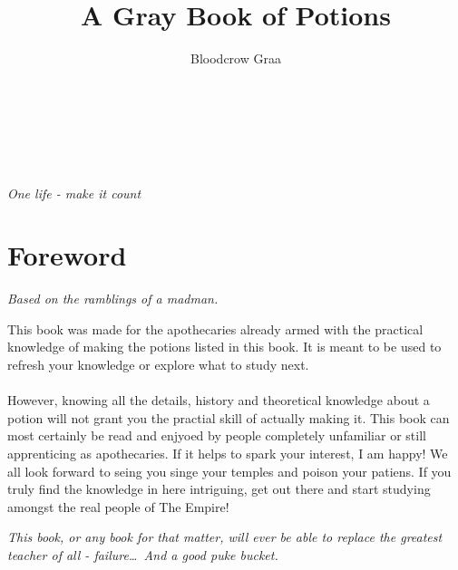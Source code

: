 \documentclass[a5paper,pagesize,10pt,bibtotoc,pointlessnumbers,
normalheadings,DIV=9,twoside=false]{scrbook}
\title{A Gray Book of Potions}
\author{Bloodcrow Graa}
\begin{document}
\begin{titlepage}
		\\
        \vspace{1mm}
        \\
		\vspace{10mm}
		\\
		\vspace{\fill}
\end{titlepage}

\newpage
\thispagestyle {empty}

\vspace*{2cm}

\begin{center}
	\Large{
		\textit{One life - make it count}
	}
\end{center}
\newpage

\tableofcontents



\vspace*{\fill}
\chapter{Foreword}
\begin{center}
    \textit{Based on the ramblings of a madman.}
\end{center}
This book was made for the apothecaries already armed with the practical knowledge of making the potions listed in this book. It is meant to be used to refresh your knowledge or explore what to study next.\\\\
However, knowing all the details, history and theoretical knowledge about a potion will not grant you the practial skill of actually making it. This book can most certainly be read and enjyoed by people completely unfamiliar or still apprenticing as apothecaries. If it helps to spark your interest, I am happy! We all look forward to seing you singe your temples and poison your patiens. If you truly find the knowledge in here intriguing, get out there and start studying amongst the real people of The Empire!\\
\begin{center}
    \textit{This book, or any book for that matter, will ever be able to replace the greatest teacher of all - failure\dots~And a good puke bucket.}
\end{center}
\vspace*{\fill}
\end{document}
